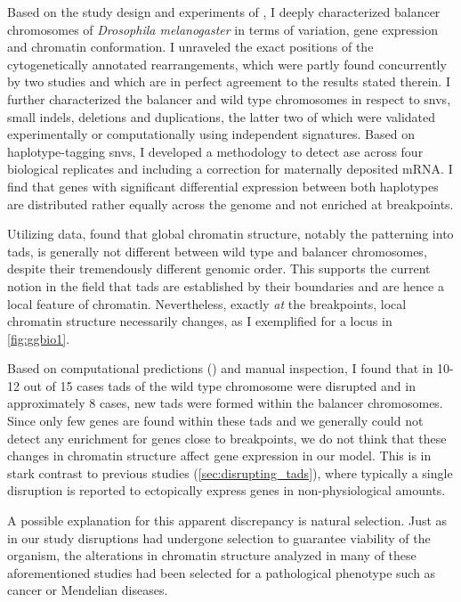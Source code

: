 Based on the study design and experiments of \yad, I deeply
characterized balancer chromosomes of \textit{Drosophila melanogaster} in terms
of variation, gene expression and chromatin conformation. I unraveled the exact
positions of the cytogenetically annotated rearrangements, which were partly
found concurrently by two studies \citep{Miller2016,Miller2018} and which are in
perfect agreement to the results stated therein. I further characterized the
balancer and wild type chromosomes in respect to \acp{snv}, small indels,
deletions and duplications, the latter two of which were validated
experimentally or computationally using independent signatures. Based on
haplotype-tagging \acp{snv}, I developed a methodology to detect \acl{ase}
across four biological replicates and including a correction for maternally
deposited mRNA. I find that genes with significant differential expression
between both haplotypes are distributed rather equally across the genome and
not enriched at breakpoints.

Utilizing \hic data, \alek found that global chromatin structure, notably the
patterning into \aclp{tad}, is generally not different between wild type and
balancer chromosomes, despite their tremendously different genomic order. This
supports the current notion in the field that \acp{tad} are established by their
boundaries and are hence a local feature of chromatin. Nevertheless, exactly \emph{at}
the breakpoints, local chromatin structure necessarily changes, as I exemplified
for a locus in \cref{fig:ggbio1}.

Based on computational \tad predictions (\alek) and manual inspection, I found
that in 10-12 out of 15 cases \acp{tad} of the wild type chromosome were
disrupted and in approximately 8 cases, new \acp{tad} were formed within the
balancer chromosomes. Since only few \ase genes are found within these \acp{tad}
and we generally could not detect any enrichment for \ase genes close to
breakpoints, we do not think that these changes in chromatin structure affect
gene expression in our model. This is in stark contrast to previous studies
(\cref{sec:disrupting_tads}), where typically a single \tad disruption is
reported to ectopically express genes in non-physiological amounts.

A possible
explanation for this apparent discrepancy is natural selection. Just as in our
study \tad disruptions had undergone selection to guarantee viability of the
organism, the alterations in chromatin structure analyzed in many of these
aforementioned studies had been selected for a pathological phenotype such as
cancer or Mendelian diseases.

